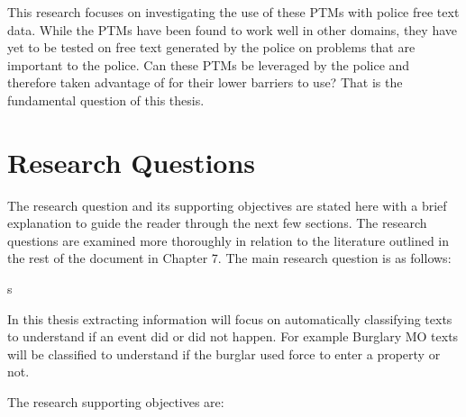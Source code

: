 This research focuses on investigating the use of these PTMs with police free text data. While the PTMs have been found to work well in other domains, they have yet to be tested on free text generated by the police on problems that are important to the police. Can these PTMs be leveraged by the police and therefore taken advantage of for their lower barriers to use? That is the fundamental question of this thesis.


\section{Research Questions}

The research question and its supporting objectives are stated here with a brief explanation to guide the reader through the next few sections. The research questions are examined more thoroughly in relation to the literature outlined in the rest of the document in Chapter 7. The main research question is as follows:

s

In this thesis extracting information will focus on automatically classifying texts to understand if an event did or did not happen. For example Burglary MO texts will be classified to understand if the burglar used force to enter a property or not.

The research supporting objectives are:

